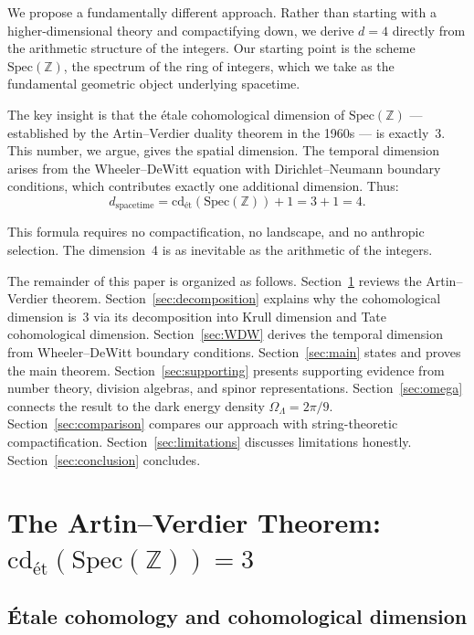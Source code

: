 \documentclass[12pt,a4paper]{article}
\theoremstyle{definition}
\newcommand{\Spec}{\mathrm{Spec}}
\newcommand{\cd}{\mathrm{cd}}
\newcommand{\ZZ}{\mathbb{Z}}
\begin{document}
We propose a fundamentally different approach. Rather than starting with a
higher-dimensional theory and compactifying down, we derive $d=4$ directly from the
arithmetic structure of the integers. Our starting point is the scheme
$\Spec(\ZZ)$, the spectrum of the ring of integers, which we take as the
fundamental geometric object underlying spacetime.

The key insight is that the \'etale cohomological dimension of $\Spec(\ZZ)$ ---
established by the Artin--Verdier duality theorem in the 1960s --- is exactly~3.
This number, we argue, gives the spatial dimension. The temporal dimension arises
from the Wheeler--DeWitt equation with Dirichlet--Neumann boundary conditions, which
contributes exactly one additional dimension. Thus:
\[
  d_{\text{spacetime}} = \cd_{\text{\'et}}(\Spec(\ZZ)) + 1 = 3 + 1 = 4.
\]

This formula requires no compactification, no landscape, and no anthropic selection.
The dimension~4 is as inevitable as the arithmetic of the integers.

The remainder of this paper is organized as follows. Section~\ref{sec:AV} reviews the
Artin--Verdier theorem. Section~\ref{sec:decomposition} explains why the cohomological
dimension is~3 via its decomposition into Krull dimension and Tate cohomological
dimension. Section~\ref{sec:WDW} derives the temporal dimension from Wheeler--DeWitt
boundary conditions. Section~\ref{sec:main} states and proves the main theorem.
Section~\ref{sec:supporting} presents supporting evidence from number theory,
division algebras, and spinor representations. Section~\ref{sec:omega} connects the
result to the dark energy density $\Omega_\Lambda = 2\pi/9$.
Section~\ref{sec:comparison} compares our approach with string-theoretic
compactification. Section~\ref{sec:limitations} discusses limitations honestly.
Section~\ref{sec:conclusion} concludes.

\section{The Artin--Verdier Theorem: $\cd_{\text{\'et}}(\Spec(\ZZ)) = 3$}\label{sec:AV}

\subsection{\'Etale cohomology and cohomological dimension}
\end{document}
